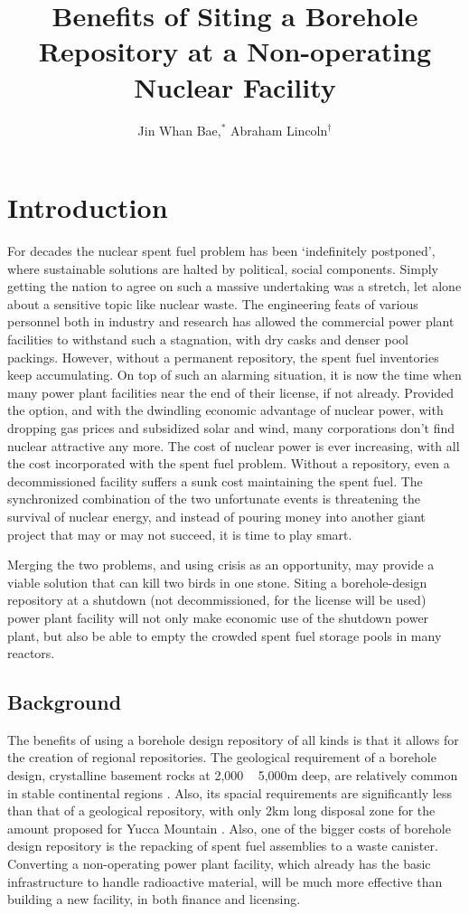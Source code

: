 \documentclass{anstrans}
\title{Benefits of Siting a Borehole Repository at a Non-operating Nuclear 
Facility}
\author{Jin Whan Bae,$^{*}$ Abraham Lincoln$^{\dagger}$}
\institute{
$^{*}$Dept. of Nuclear Plasma, and Radiological Engineering, University of Illinois at Urbana-Champaign, Urbana, IL
\and
$^{\dagger}$State Capitol Building, Springfield, IL
}
\begin{document}
\section{Introduction}

For decades the nuclear spent fuel problem has been ‘indefinitely postponed’, where sustainable solutions are halted by political, social components. Simply getting the nation to agree on such a massive undertaking was a stretch, let alone about a sensitive topic like nuclear waste. The engineering feats of various personnel both in industry and research has allowed the commercial power plant facilities to withstand such a stagnation, with dry casks and denser pool packings. However, without a permanent repository, the spent fuel inventories keep accumulating.
On top of such an alarming situation, it is now the time when many power plant facilities near the end of their license, if not already. Provided the option, and with the dwindling economic advantage of nuclear power, with dropping gas prices and subsidized solar and wind, many corporations don’t find nuclear attractive any more. The cost of nuclear power is ever increasing, with all the cost incorporated with the spent fuel problem. Without a repository, even a decommissioned facility suffers a sunk cost maintaining the spent fuel.
The synchronized combination of the two unfortunate events is threatening the survival of nuclear energy, and instead of pouring money into another giant project that may or may not succeed, it is time to play smart.

Merging the two problems, and using crisis as an opportunity, may provide a viable solution that can kill two birds in one stone.
Siting a borehole-design repository at a shutdown (not decommissioned, for the license will be used) power plant facility will not only make economic use of the shutdown power plant, but also be able to empty the crowded spent fuel storage pools in many reactors.


\subsection{Background}

The benefits of using a borehole design repository of all kinds is that it allows for the creation of regional repositories. The geological requirement of a borehole design, crystalline basement rocks at 2,000 ~ 5,000m deep, are relatively common in stable continental regions \cite{arnold_geological_2016}. Also, its spacial requirements are significantly less than that of a geological repository, with only 2km long disposal zone for the amount proposed for Yucca Mountain \cite{brady_deep_2009}.
Also, one of the bigger costs of borehole design repository is the repacking of spent fuel assemblies to a waste canister. Converting a non-operating power plant facility, which already has the basic infrastructure to handle radioactive material, will be much more effective than building a new facility, in both finance and licensing. 
\end{document}
